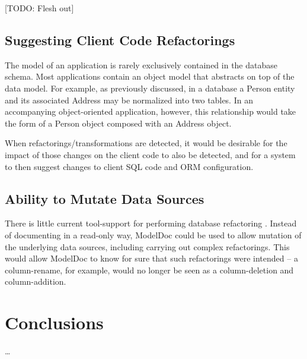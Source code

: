 \documentclass{acm_proc_article-sp}
\begin{document}
[TODO: Flesh out]

\subsection{Suggesting Client Code Refactorings}

The model of an application is rarely exclusively contained in the database
schema.  Most applications contain an object model that abstracts on top of the
data model.  For example, as previously discussed, in a database a Person
entity and its associated Address may be normalized into two tables.  In an
accompanying object-oriented application, however, this relationship would take
the form of a Person object composed with an Address object.

When refactorings/transformations are detected, it would be desirable for the
impact of those changes on the client code to also be detected, and for a
system to then suggest changes to client SQL code and ORM configuration.

\subsection{Ability to Mutate Data Sources}

There is little current tool-support for performing database refactoring
\cite{ambler:refactoring}.  Instead of documenting in a read-only way, ModelDoc
could be used to allow mutation of the underlying data sources, including
carrying out complex refactorings.  This would allow ModelDoc to know for sure
that such refactorings were intended -- a column-rename, for example, would no
longer be seen as a column-deletion and column-addition.

\section{Conclusions}

\ldots



\balancecolumns
\end{document}
